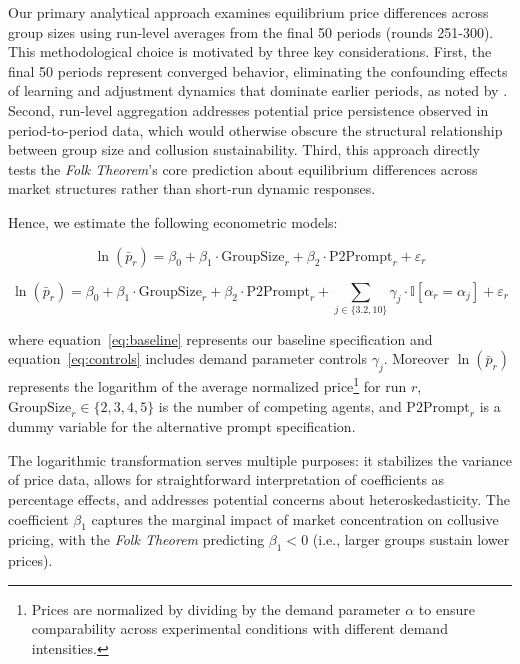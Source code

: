 Our primary analytical approach examines equilibrium price differences across group sizes using run-level averages from the final 50 periods (rounds 251-300). This methodological choice is motivated by three key considerations. First, the final 50 periods represent converged behavior, eliminating the confounding effects of learning and adjustment dynamics that dominate earlier periods, as noted by \textcite{fish_algorithmic_2025}. Second, run-level aggregation addresses potential price persistence observed in period-to-period data, which would otherwise obscure the structural relationship between group size and collusion sustainability. Third, this approach directly tests the \emph{Folk Theorem}'s core prediction about equilibrium differences across market structures rather than short-run dynamic responses.

Hence, we estimate the following econometric models:

\begin{equation}\label{eq:baseline}
    \ln(\bar{p}_r) = \beta_0 + \beta_1 \cdot \text{GroupSize}_r + \beta_2 \cdot \text{P2Prompt}_r + \varepsilon_r
\end{equation}

\begin{equation}\label{eq:controls}
    \ln(\bar{p}_r) = \beta_0 + \beta_1 \cdot \text{GroupSize}_r + \beta_2 \cdot \text{P2Prompt}_r + \sum_{j \in \{3.2, 10\}} \gamma_j \cdot \mathbb{I}[\alpha_r = \alpha_j] + \varepsilon_r
\end{equation}

where equation~\eqref{eq:baseline} represents our baseline specification and equation~\eqref{eq:controls} includes demand parameter controls $\gamma_j$. Moreover $\ln(\bar{p}_r)$ represents the logarithm of the average normalized price\footnote{Prices are normalized by dividing by the demand parameter $\alpha$ to ensure comparability across experimental conditions with different demand intensities.} for run $r$, $\text{GroupSize}_r \in \{2,3,4,5\}$ is the number of competing agents, and $\text{P2Prompt}_r$ is a dummy variable for the alternative prompt specification.

The logarithmic transformation serves multiple purposes: it stabilizes the variance of price data, allows for straightforward interpretation of coefficients as percentage effects, and addresses potential concerns about heteroskedasticity. The coefficient $\beta_1$ captures the marginal impact of market concentration on collusive pricing, with the \emph{Folk Theorem} predicting $\beta_1 < 0$ (i.e., larger groups sustain lower prices).

